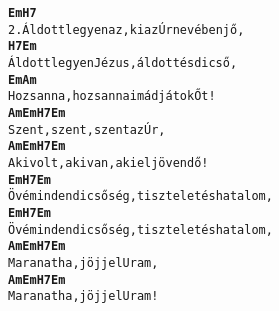 \cleardoublepage
{}
\kottastart
{}
\kottaend
\begin{minipage}{\textwidth}
\begin{alltt}
\textbf{   Em                                  H7}
2. Áldott legyen az, ki az Úr nevében jő,
\textbf{   H7                                 Em}
   Áldott legyen Jézus, áldott és dicső,
\textbf{    Em                          Am}
   Hozsanna, hozsanna imádjátok Őt!
\textbf{     Am     Em     H7     Em}
   Szent, szent, szent az Úr,
\textbf{        Am        Em      H7      Em}
   Aki volt, aki van, aki eljövendő!
\textbf{   Em               H7                    Em}
   Övé minden dicsőség, tisztelet és hatalom,
\textbf{   Em               H7                    Em}
   Övé minden dicsőség, tisztelet és hatalom,
\textbf{        Am  Em  H7     Em}
   Marana tha, jöjj el Uram,
\textbf{        Am  Em  H7     Em}
   Marana tha, jöjj el Uram!
\end{alltt}
\vspace{0.0cm}
\versszakspacing
\end{minipage}
~\vspace{1.0cm}
\newline
